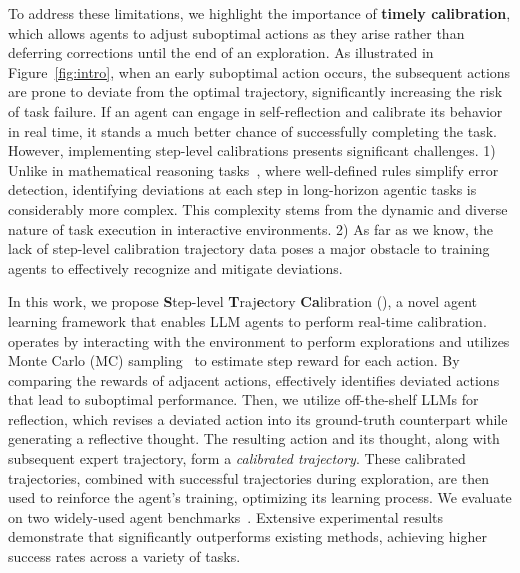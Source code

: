 To address these limitations, we highlight the importance of \textbf{timely calibration}, which allows agents to adjust suboptimal actions as they arise rather than deferring corrections until the end of an exploration. 
As illustrated in Figure~\ref{fig:intro}, when an early suboptimal action occurs, the subsequent actions are prone to deviate from the optimal trajectory, significantly increasing the risk of task failure. If an agent can engage in self-reflection and calibrate its behavior in real time, it stands a much better chance of successfully completing the task. 
However, implementing step-level calibrations presents significant challenges. 
1) Unlike in mathematical reasoning tasks~\citep{kumar2024training,xi2025rise}, where well-defined rules simplify error detection, identifying deviations at each step in long-horizon agentic tasks is considerably more complex. This complexity stems from the dynamic and diverse nature of task execution in interactive environments. 
2) As far as we know, the lack of step-level calibration trajectory data poses a major obstacle to training agents to effectively recognize and mitigate deviations.

In this work, we propose \textbf{S}tep-level \textbf{T}raj\textbf{e}ctory \textbf{Ca}libration (\textbf{\model}), a novel agent learning framework that enables LLM agents to perform real-time calibration. 
\model operates by interacting with the environment to perform explorations and utilizes Monte Carlo (MC) sampling~\citep{kakade2002approximately} to estimate step reward for each action. 
By comparing the rewards of adjacent actions, \model effectively identifies deviated actions that lead to suboptimal performance.
Then, we utilize off-the-shelf LLMs for reflection, which revises a deviated action into its ground-truth counterpart while generating a reflective thought. The resulting action and its thought, along with subsequent expert trajectory, form a \textit{calibrated trajectory}.
These calibrated trajectories, combined with successful trajectories during exploration, are then used to reinforce the agent's training, optimizing its learning process.
We evaluate \model on two widely-used agent benchmarks~\citep{puig2018virtualhome,shridhar2020alfworld}. Extensive experimental results demonstrate that \model significantly outperforms existing methods, achieving higher success rates across a variety of tasks. 



